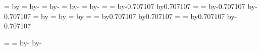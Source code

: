 {  %
  {
    \pgf@process{\radius}
    \pgf@ya=\pgf@y%
    \pgf@process{\centerpoint}
    \advance\pgf@y by\pgf@ya
  }
  {
    \pgf@process{\radius}
    \pgf@ya=\pgf@y%
    \pgf@process{\centerpoint}
    \advance\pgf@y by-\pgf@ya
  }
  {
    \pgf@process{\radius}
    \pgf@xa=\pgf@x%
    \pgf@process{\centerpoint}
    \advance\pgf@x by-\pgf@xa
  }
  {%
    \pgf@process{\radius}
    \pgf@xa=\pgf@x%
    \pgf@process{\centerpoint}
    \advance\pgf@x by-\pgf@xa%
    \pgfmathsetlength\pgf@y{.5ex}
  }
  {%
    \pgf@process{\radius}
    \pgf@xa=\pgf@x%
    \pgf@process{\centerpoint}
    \advance\pgf@x by-\pgf@xa%
    \pgf@y=0pt
  }
  {
    \pgf@process{\radius}
    \pgf@xa=\pgf@x%
    \pgf@ya=\pgf@y%
    \pgf@process{\centerpoint}
    \advance\pgf@x by-0.707107\pgf@xa
    \advance\pgf@y by0.707107\pgf@ya
  }
  {
    \pgf@process{\radius}
    \pgf@xa=\pgf@x%
    \pgf@ya=\pgf@y%
    \pgf@process{\centerpoint}
    \advance\pgf@x by-0.707107\pgf@xa
    \advance\pgf@y by-0.707107\pgf@ya
  }
  {%
    \pgf@process{\radius}
    \pgf@xa=\pgf@x%
    \pgf@process{\centerpoint}
    \advance\pgf@x by\pgf@xa
  }
  {%
    \pgf@process{\radius}
    \pgf@xa=\pgf@x%
    \pgf@process{\centerpoint}
    \advance\pgf@x by\pgf@xa%
    \pgfmathsetlength\pgf@y{.5ex}
  }
  {%
    \pgf@process{\radius}
    \pgf@xa=\pgf@x%
    \pgf@process{\centerpoint}
    \advance\pgf@x by\pgf@xa%
    \pgf@y=0pt
  }
  {
    \pgf@process{\radius}
    \pgf@xa=\pgf@x%
    \pgf@ya=\pgf@y%
    \pgf@process{\centerpoint}
    \advance\pgf@x by0.707107\pgf@xa
    \advance\pgf@y by0.707107\pgf@ya
  }
  {
    \pgf@process{\radius}
    \pgf@xa=\pgf@x%
    \pgf@ya=\pgf@y%
    \pgf@process{\centerpoint}
    \advance\pgf@x by0.707107\pgf@xa
    \advance\pgf@y by-0.707107\pgf@ya
  }

  \backgroundpath
  {
    \pgf@process{\radius}%
    \pgfutil@tempdima=\pgf@x%
    \pgfutil@tempdimb=\pgf@y%
    \advance\pgfutil@tempdima by-\pgf@xb%
    \advance\pgfutil@tempdimb by-\pgf@yb%
    \pgfpathellipse{\centerpoint}{\pgfqpoint{\pgfutil@tempdima}{0pt}}{\pgfqpoint{0pt}{\pgfutil@tempdimb}}%
  }
}




